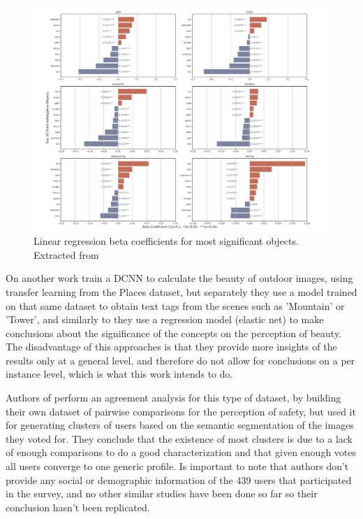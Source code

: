 \begin{figure}[ht]
	\begin{center}
	\includegraphics[width=1\textwidth]{./figures/zhang.png}
	\caption[Beta Coefficients]{ Linear regression beta coefficients for most significant objects. Extracted from  }
	\label{fig:beta}
	\end{center}
\end{figure}

On another work  train a DCNN to calculate the beauty of outdoor images,
using transfer learning from the Places dataset, but separately they use a model trained on that same dataset to obtain text tags from
the scenes such as 'Mountain' or 'Tower', and similarly to  they use a regression model
(elastic net) to make conclusions about the significance of the concepts on the perception of beauty. The disadvantage
of this approaches is that they provide more insights of the results only at a general level, and therefore do not allow for
conclusions on a per instance level, which is what this work intends to do.

Authors of  perform an agreement analysis for this type of dataset,
by building their own dataset of pairwise comparisons for the perception of safety, but used it
for  generating clusters of users based on the semantic segmentation of the images they voted for.
They conclude that the existence of most clusters is due to a lack of enough comparisons to do a good characterization
and that given enough votes all users converge to one generic profile. Is important to note
that authors don't provide any social or demographic information of the 439 users that
participated in the survey, and no other similar studies have been done so
far so their conclusion hasn't been replicated.

